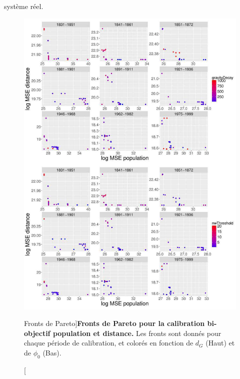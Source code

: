 système réel.

\begin{figure}
	\includegraphics[width=\linewidth,height=0.9\textheight]{Figures/Final/6-2-3-fig-macrocoevol-pareto}
	\caption[Pareto fronts][Fronts de Pareto]{\label{fig:macrocoevol:pareto}}{\textbf{Fronts de Pareto pour la calibration bi-objectif population et distance.} Les fronts sont donnés pour chaque période de calibration, et colorés en fonction de $d_G$ (Haut) et de $\phi_0$ (Bas).\comment[FL]{()}\label{fig:macrocoevol:pareto}}
\end{figure}


